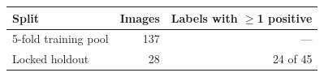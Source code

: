 \begin{tabular}{lrr}
\toprule
Split & Images & Labels with $\geq$1 positive \\
\midrule
5-fold training pool & 137 & --- \\
Locked holdout & 28 & 24 of 45 \\
\bottomrule
\end{tabular}
